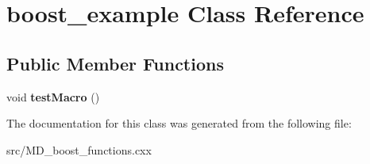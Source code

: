 \hypertarget{classboost__example}{}\section{boost\+\_\+example Class Reference}
\label{classboost__example}
\subsection*{Public Member Functions}
\begin{DoxyCompactItemize}
\item 
\mbox{\label{classboost__example_ace81d861dafaf048f9f0fa77d45886d6}} 
void {\bfseries test\+Macro} ()
\end{DoxyCompactItemize}


The documentation for this class was generated from the following file\+:\begin{DoxyCompactItemize}
\item 
src/M\+D\+\_\+boost\+\_\+functions.\+cxx\end{DoxyCompactItemize}
